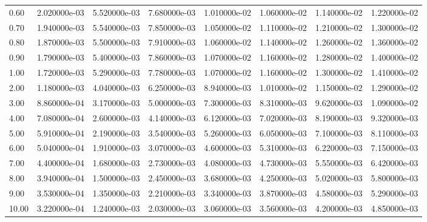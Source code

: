 \begin{tabular}{lrrrrrrr}
0.60  &  2.020000e-03 &  5.520000e-03 &  7.680000e-03 &  1.010000e-02 &  1.060000e-02 &  1.140000e-02 &  1.220000e-02 \\
0.70  &  1.940000e-03 &  5.540000e-03 &  7.850000e-03 &  1.050000e-02 &  1.110000e-02 &  1.210000e-02 &  1.300000e-02 \\
0.80  &  1.870000e-03 &  5.500000e-03 &  7.910000e-03 &  1.060000e-02 &  1.140000e-02 &  1.260000e-02 &  1.360000e-02 \\
0.90  &  1.790000e-03 &  5.400000e-03 &  7.860000e-03 &  1.070000e-02 &  1.160000e-02 &  1.280000e-02 &  1.400000e-02 \\
1.00  &  1.720000e-03 &  5.290000e-03 &  7.780000e-03 &  1.070000e-02 &  1.160000e-02 &  1.300000e-02 &  1.410000e-02 \\
2.00  &  1.180000e-03 &  4.040000e-03 &  6.250000e-03 &  8.940000e-03 &  1.010000e-02 &  1.150000e-02 &  1.290000e-02 \\
3.00  &  8.860000e-04 &  3.170000e-03 &  5.000000e-03 &  7.300000e-03 &  8.310000e-03 &  9.620000e-03 &  1.090000e-02 \\
4.00  &  7.080000e-04 &  2.600000e-03 &  4.140000e-03 &  6.120000e-03 &  7.020000e-03 &  8.190000e-03 &  9.320000e-03 \\
5.00  &  5.910000e-04 &  2.190000e-03 &  3.540000e-03 &  5.260000e-03 &  6.050000e-03 &  7.100000e-03 &  8.110000e-03 \\
6.00  &  5.040000e-04 &  1.910000e-03 &  3.070000e-03 &  4.600000e-03 &  5.310000e-03 &  6.220000e-03 &  7.150000e-03 \\
7.00  &  4.400000e-04 &  1.680000e-03 &  2.730000e-03 &  4.080000e-03 &  4.730000e-03 &  5.550000e-03 &  6.420000e-03 \\
8.00  &  3.940000e-04 &  1.500000e-03 &  2.450000e-03 &  3.680000e-03 &  4.250000e-03 &  5.020000e-03 &  5.800000e-03 \\
9.00  &  3.530000e-04 &  1.350000e-03 &  2.210000e-03 &  3.340000e-03 &  3.870000e-03 &  4.580000e-03 &  5.290000e-03 \\
10.00 &  3.220000e-04 &  1.240000e-03 &  2.030000e-03 &  3.060000e-03 &  3.560000e-03 &  4.200000e-03 &  4.850000e-03 \\
\bottomrule
\end{tabular}
